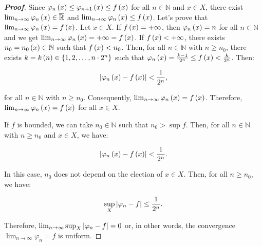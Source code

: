 \begin{theorem}
\begin{proof}[\rm\textbf{Proof}]
    Since $\varphi_n\left(x\right)\leq\varphi_{n+1}\left(x\right)\leq f\left(x\right)$ for all $n\in\mathbb{N}$ and $x\in X$, there exist $\lim_{n\to\infty}{\varphi_n\left(x\right)}\in\overline{\mathbb{R}}$ and $\lim_{n\to\infty}{\varphi_n\left(x\right)}\leq f\left(x\right)$. Let's prove that $\lim_{n\to\infty}{\varphi_n\left(x\right)}=f\left(x\right)$. Let $x\in X$. If $f\left(x\right)=+\infty$, then $\varphi_n\left(x\right)=n$ for all $n\in\mathbb{N}$ and we get $\lim_{n\to\infty}{\varphi_n\left(x\right)}=+\infty=f\left(x\right)$. If $f\left(x\right)<+\infty$, there exists $n_0=n_0\left(x\right)\in\mathbb{N}$ such that $f\left(x\right)<n_0$. Then, for all $n\in\mathbb{N}$ with $n\geq n_0$, there exists $k=k\left(n\right)\in\left\{1,2,\dots,n\cdot 2^n\right\}$ such that $\varphi_n\left(x\right)=\frac{k-1}{2^n}\leq f\left(x\right)<\frac{k}{2^n}$. Then:

    \begin{equation}
      \left|\varphi_n\left(x\right)-f\left(x\right)\right|<\frac{1}{2^n},
    \end{equation}

    for all $n\in\mathbb{N}$ with $n\geq n_0$. Consequently, $\lim_{n\to\infty}{\varphi_n\left(x\right)}=f\left(x\right)$. Therefore, $\lim_{n\to\infty}{\varphi_n\left(x\right)}=f\left(x\right)$ for all $x\in X$.

    If $f$ is bounded, we can take $n_0\in\mathbb{N}$ such that $n_0>\sup{f}$. Then, for all $n\in\mathbb{N}$ with $n\geq n_0$ and $x\in X$, we have:

    \begin{equation}
      \left|\varphi_n\left(x\right)-f\left(x\right)\right|<\frac{1}{2^n}.
    \end{equation}

    In this case, $n_0$ does not depend on the election of $x\in X$. Then, for all $n\geq n_0$, we have:

    \begin{equation}
      \sup_{X}{\left|\varphi_n-f\right|}\leq\frac{1}{2^n}.
    \end{equation}

    Therefore, $\lim_{n\to\infty}{\sup_{X}{\left|\varphi_n-f\right|}}=0$ or, in other words, the convergence $\lim_{n\to\infty}{\varphi_n}=f$ is uniform.
  \end{proof}
\end{theorem}

